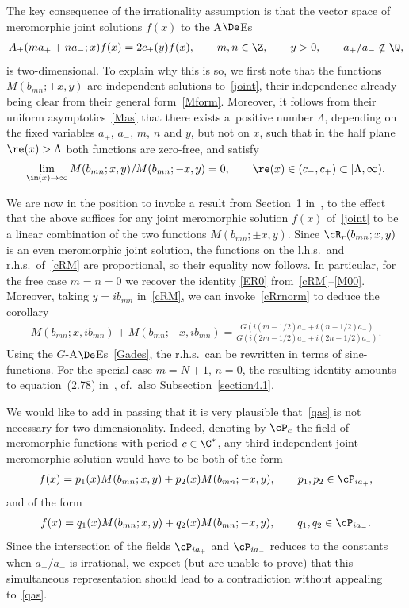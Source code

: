 The key consequence of the irrationality assumption is that the vector space of meromorphic joint solutions $f(x)$ to the A$\De$Es
\begin{gather}\label{joint}
A_{\pm}( ma_{+}+na_{-};x)f(x)=2c_{\pm}(y)f(x),\qquad  m,n\in\Z,\qquad y>0,\qquad  a_{+}/a_{-}\notin \Q,
\end{gather}
is two-dimensional.
To explain why this is so, we f\/irst note that the functions $M(b_{mn};\pm x,y)$ are independent solutions to~\eqref{joint}, their independence already being clear from their general form~\eqref{Mform}. Moreover, it follows from their uniform asymptotics~\eqref{Mas} that there exists a~po\-si\-ti\-ve number $\Lambda$, depending on the f\/ixed variables $a_+$, $a_-$, $m$, $n$ and $y$, but not on $x$, such that in the half plane $\re(x)>\Lambda$ both functions are zero-free, and satisfy
\begin{gather}\label{qas}
\lim_{\im(x)\to\infty}M(b_{mn};x,y)/M(b_{mn};-x,y)=0,\qquad \re(x)\in (c_{-},c_{+})\subset [\Lambda, \infty).
\end{gather}

We are now in the position to invoke a result from Section~1 in~\cite{side}, to the ef\/fect that the above  suf\/f\/ices for any joint meromorphic solution $f(x)$ of~\eqref{joint} to be a linear combination of the two functions $M(b_{mn};\pm x,y)$.  Since $\cR_r(b_{mn};x,y)$ is an even meromorphic joint solution, the functions on the l.h.s.\ and r.h.s.\ of~\eqref{cRM} are proportional, so their equality now follows. In particular, for the free case $m=n=0$ we recover the identity \eqref{ER0} from~\eqref{cRM}--\eqref{M00}. Moreover, taking $y=ib_{mn}$ in~\eqref{cRM}, we can invoke~\eqref{cRrnorm} to deduce the corollary
\begin{gather}\label{Mid}
M(b_{mn};x,ib_{mn})+M(b_{mn};-x,ib_{mn})=\frac{G(i(m-1/2)a_{+}+i(n-1/2)a_{-})}{G(i(2m-1/2)a_{+}+i(2n-1/2)a_{-})}.
\end{gather}
Using the $G$-A$\De$Es~\eqref{Gades}, the r.h.s.\ can be rewritten in terms of sine-functions. For the special case $m=N+1$, $n=0$, the resulting identity amounts to equation~(2.78) in~\cite{GLFII}, cf.~also Subsection~\ref{section4.1}.

We would like to add in passing that it is very plausible that~\eqref{qas} is not necessary for two-dimensionality. Indeed, denoting by $\cP_c$ the f\/ield of meromorphic functions with period $c\in\C^{*}$, any third independent joint meromorphic solution would have to be both of the form
\begin{gather}\label{form1}
f(x)=p_1(x)M(b_{mn};x,y)+p_2(x)M(b_{mn};-x,y),\qquad p_1,p_2\in\cP_{ia_{+}},
\end{gather}
and of the form
\begin{gather}\label{form2}
f(x)=q_1(x)M(b_{mn};x,y)+q_2(x)M(b_{mn};-x,y),\qquad  q_1,q_2\in\cP_{ia_{-}}.
\end{gather}
Since the intersection of the f\/ields $\cP_{ia_{+}}$ and $\cP_{ia_{-}}$ reduces
 to the constants when $a_{+}/a_{-}$ is irrational, we expect (but are unable to prove) that this simultaneous representation should lead to a contradiction without appealing to~\eqref{qas}.

